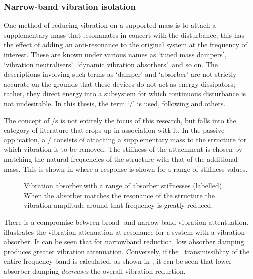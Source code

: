 

\subsubsection{Narrow-band vibration isolation}

One method of reducing vibration on a supported mass is to attach a supplementary mass that resonanates in concert with the disturbance; this has the effect of adding an anti-resonance to the original system at the frequency of interest.
These are known under various names as `tuned mass dampers', `vibration neutralisers', `dynamic vibration absorbers', and so on.
The descriptions involving such terms as `damper' and `absorber' are not strictly accurate on the grounds that these devices do not act as energy dissipators; rather, they direct energy into a subsystem for which continuous disturbance is not undesirable.
In this thesis, the term `\vibneut/' is used, following \textcite{kidner1998} and others.

The concept of \vibneut/s is not entirely the focus of this research, but falls into the category of literature that crops up in association with it.
In the passive application, a \vibneut/ consists of attaching a supplementary mass to the structure for which vibration is to be removed.
The stiffness of the attachment is chosen by matching the natural frequencies of the structure with that of the additional mass.
This is shown in  where a response is shown for a range of stiffness values.

\begin{figure}
   \caption{
     Vibration absorber with a range of absorber stiffnesses (labelled).
     When the absorber matches the resonance of the structure the vibration amplitude around that frequency is greatly reduced.}
\end{figure}

There is a compromise between broad- and narrow-band vibration attentuation.
 illustrates the vibration attenuation at resonance for a system with a vibration absorber.
It can be seen that for narrowband reduction, low absorber damping produces greater vibration attenuation.
Conversely, if the \RMS\ transmissiblity of the entire frequency band is calculated, as shown in , it can be seen that lower absorber damping \emph{decreases} the overall vibration reduction.

